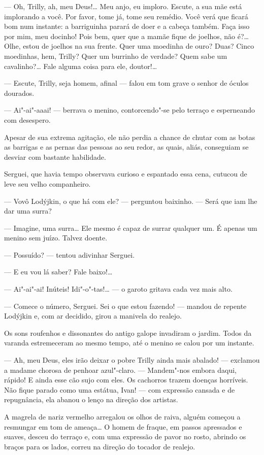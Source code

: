--- Oh, Trilly, ah, meu Deus!\ldots{} Meu anjo, eu imploro. Escute, a sua mãe
está implorando a você. Por favor, tome já, tome seu remédio. Você verá
que ficará bom num instante: a barriguinha parará de doer e a cabeça
também. Faça isso por mim, meu docinho! Pois bem, quer que a mamãe fique
de joelhos, não é?\ldots{} Olhe, estou de joelhos na sua frente. Quer uma
moedinha de ouro? Duas? Cinco moedinhas, hem, Trilly? Quer um burrinho
de verdade? Quem sabe um cavalinho?\ldots{} Fale alguma coisa para ele,
doutor!\ldots{}

--- Escute, Trilly, seja homem, afinal --- falou em tom grave o senhor
de óculos dourados.

--- Ai"-ai"-aaai! --- berrava o menino, contorcendo"-se pelo terraço e
esperneando com desespero.

Apesar de sua extrema agitação, ele não perdia a chance de chutar com as
botas as barrigas e as pernas das pessoas ao seu redor, as quais, aliás,
conseguiam se desviar com bastante habilidade.

Serguei, que havia tempo observava curioso e espantado essa cena,
cutucou de leve seu velho companheiro.

--- Vovô Lodýjkin, o que há com ele? --- perguntou baixinho. --- Será
que iam lhe dar uma surra?

--- Imagine, uma surra\ldots{} Ele mesmo é capaz de surrar qualquer um. É
apenas um menino sem juízo. Talvez doente.

--- Possuído? --- tentou adivinhar Serguei.

--- E eu vou lá saber? Fale baixo!\ldots{}

--- Ai"-ai"-ai! Inúteis! Idi"-o"-tas!\ldots{} --- o garoto gritava cada vez mais
alto.

--- Comece o número, Serguei. Sei o que estou fazendo! --- mandou de
repente Lodýjkin e, com ar decidido, girou a manivela do realejo.

Os sons roufenhos e dissonantes do antigo galope invadiram o jardim.
Todos da varanda estremeceram ao mesmo tempo, até o menino se calou por
um instante.

--- Ah, meu Deus, eles irão deixar o pobre Trilly ainda mais abalado!
--- exclamou a madame chorosa de penhoar azul"-claro. --- Mandem"-nos
embora daqui, rápido! E ainda esse cão sujo com eles. Os cachorros
trazem doenças horríveis. Não fique parado como uma estátua, Ivan! ---
com expressão cansada e de repugnância, ela abanou o lenço na direção
dos artistas.

A magrela de nariz vermelho arregalou os olhos de raiva, alguém começou
a resmungar em tom de ameaça\ldots{} O homem de fraque, em passos apressados
e suaves, desceu do terraço e, com uma expressão de pavor no rosto,
abrindo os braços para os lados, correu na direção do tocador de
realejo.


